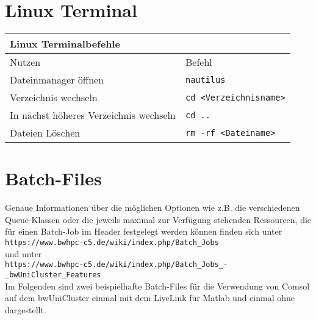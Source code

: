 \documentclass[12pt]{scrartcl}%
\theoremstyle{nonumberplain}
\begin{document}
\section{Linux Terminal}
\begin{tabular}{ll} 
\toprule
\textbf{Linux Terminalbefehle}\\  
\midrule 
Nutzen & Befehl\\ 
\midrule 
Dateinmanager öffnen & \texttt{nautilus}\\
Verzeichnis wechseln & \texttt{cd <Verzeichnisname>}\\
In nächst höheres Verzeichnis wechseln & \texttt{cd ..}\\
Dateien Löschen & \texttt{rm -rf <Dateiname>} \\
\bottomrule
\end{tabular}

\section{Batch-Files}
Genaue Informationen über die möglichen Optionen wie z.B. die verschiedenen Queue-Klassen oder die jeweils maximal zur Verfügung stehenden Ressourcen, die für einen Batch-Job im Header festgelegt werden können finden sich unter \\ 
\texttt{https://www.bwhpc-c5.de/wiki/index.php/Batch\_Jobs}\\
und unter \\
\texttt{https://www.bwhpc-c5.de/wiki/index.php/Batch\_Jobs\_-\_bwUniCluster\_Features} \\
Im Folgenden sind zwei beispielhafte Batch-Files für die Verwendung von Comsol auf dem bwUniCluster einmal mit dem LiveLink für Matlab und einmal ohne dargestellt.


\newpage






\end{document}
